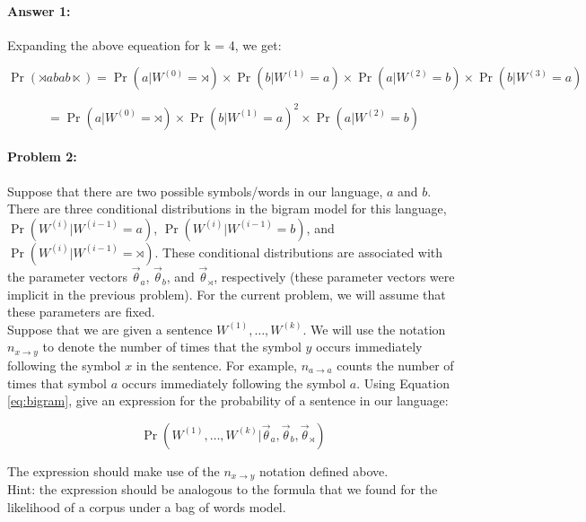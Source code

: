 \documentclass[10pt]{article}
\begin{document}
\paragraph{Answer 1:} 
Expanding the above equeation for k = 4, we get: 

\begin{equation*}
\Pr(\rtimes abab \ltimes)=\Pr(a | W^{(0)}=\rtimes)\times\Pr(b | W^{(1)}=a)\times\Pr(a | W^{(2)}=b)\times\Pr(b | W^{(3)}=a)
\end{equation*}

\begin{equation*}
=\Pr(a | W^{(0)}=\rtimes)\times\Pr(b | W^{(1)}=a)^2 \times\Pr(a | W^{(2)}=b)
\end{equation*}

\hrulefill
\paragraph{Problem 2:}

Suppose that there are two possible symbols/words in our language, $a$
and $b$. There are three conditional distributions in the bigram model
for this language, $\Pr(W^{(i)} | W^{(i-1)}=a)$,
$\Pr(W^{(i)} | W^{(i-1)}=b)$, and $\Pr(W^{(i)} | W^{(i-1)}=\rtimes)$.
These conditional distributions are associated with the parameter
vectors $\vec{\theta}_{a}$, $\vec{\theta}_{b}$, and
$\vec{\theta}_{\rtimes}$, respectively (these parameter vectors were
implicit in the previous problem). For the current problem, we will
assume that these parameters are fixed.\\

\noindent Suppose that we are given a sentence $W^{(1)},\dots,W^{(k)}$. We will
use the notation $n_{x \rightarrow y}$ to denote the number of times
that the symbol $y$ occurs immediately following the symbol $x$ in the
sentence. For example, $n_{a \rightarrow a}$ counts the number of
times that symbol $a$ occurs immediately following the symbol $a$.
Using Equation \ref{eq:bigram}, give an expression for the probability
of a sentence in our language:

\begin{equation*}
\Pr(W^{(1)},\dots,W^{(k)} | \vec{\theta}_{a}, \vec{\theta}_{b}, \vec{\theta}_{\rtimes})
\end{equation*}

\noindent The expression should make use of the $n_{x \rightarrow y}$ notation
defined above.\\

\noindent Hint: the expression should be analogous to the formula that we found
for the likelihood of a corpus under a bag of words model.
\end{document}
